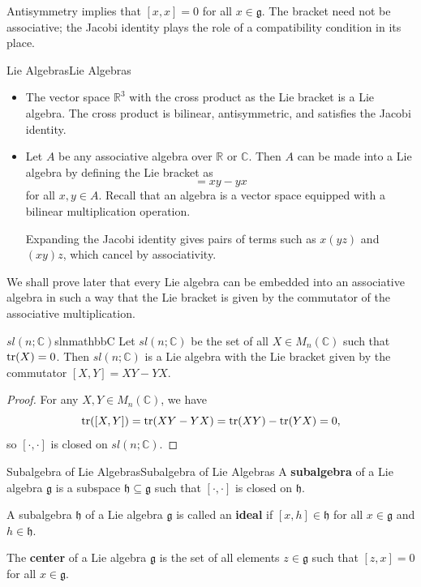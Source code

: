 \documentclass[../main.tex]{subfiles}
\begin{document}
Antisymmetry implies that $[x,x]=0$ for all $x\in\mathfrak{g}$. The bracket need not be associative; the Jacobi identity plays the role of a compatibility condition in its place.

\begin{example}{Lie Algebras}{Lie Algebras}
  \begin{itemize}
    \item The vector space $\mathbb{R}^3$ with the cross product as the Lie bracket is a Lie algebra. The cross product is bilinear, antisymmetric, and satisfies the Jacobi identity.
    \item Let $A$ be any associative algebra over $\mathbb{R}$ or $\mathbb{C}$. Then $A$ can be made into a Lie algebra by defining the Lie bracket as
      \begin{equation}
        [x,y]=xy-yx
      \end{equation}
      for all $x,y\in A$. Recall that an algebra is a vector space equipped with a bilinear multiplication operation.

      Expanding the Jacobi identity gives pairs of terms such as $x(yz)$ and $(xy)z$, which cancel by associativity.
  \end{itemize}
\end{example}

\begin{remark}
  We shall prove later that every Lie algebra can be embedded into an associative algebra in such a way that the Lie bracket is given by the commutator of the associative multiplication.
\end{remark}

\begin{example}{$sl(n;\mathbb{C})$}{slnmathbbC}
  Let $sl(n;\mathbb{C})$ be the set of all $X \in M_n(\mathbb{C})$ such that $\operatorname{tr}(X)=0$. Then $sl(n;\mathbb{C})$ is a Lie algebra with the Lie bracket given by the commutator $[X,Y]=XY-YX$.

  \begin{proof}
    For any $X,Y\in M_n(\mathbb{C})$, we have
    \begin{equation*}
      \operatorname{tr}([X,Y])=\operatorname{tr}(XY-YX)=\operatorname{tr}(XY)-\operatorname{tr}(YX)=0,
    \end{equation*}
    so $[\cdot,\cdot]$ is closed on $sl(n;\mathbb{C})$.
  \end{proof}
\end{example}

\begin{definition}{Subalgebra of Lie Algebras}{Subalgebra of Lie Algebras}
  A \textbf{subalgebra} of a Lie algebra $\mathfrak{g}$ is a subspace $\mathfrak{h}\subseteq\mathfrak{g}$ such that $[\cdot,\cdot]$ is closed on $\mathfrak{h}$.

  A subalgebra $\mathfrak{h}$ of a Lie algebra $\mathfrak{g}$ is called an \textbf{ideal} if $[x,h]\in\mathfrak{h}$ for all $x\in\mathfrak{g}$ and $h\in\mathfrak{h}$.

  The \textbf{center} of a Lie algebra $\mathfrak{g}$ is the set of all elements $z\in\mathfrak{g}$ such that $[z,x]=0$ for all $x\in\mathfrak{g}$.
\end{definition}
\end{document}
